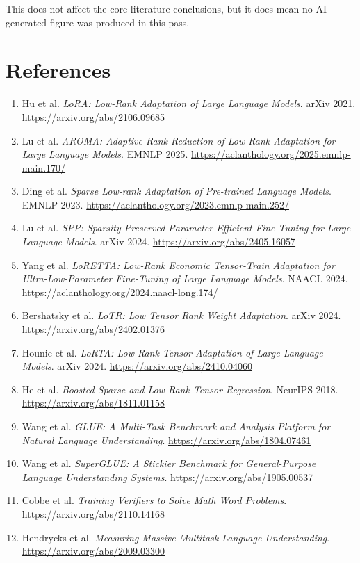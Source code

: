 \documentclass[11pt]{article}
\begin{document}
This does not affect the core literature conclusions, but it does mean no AI-generated figure was produced in this pass.

\section{References}

\begin{enumerate}
\item Hu et al. \textit{LoRA: Low-Rank Adaptation of Large Language Models}. arXiv 2021. \url{https://arxiv.org/abs/2106.09685}
\item Lu et al. \textit{AROMA: Adaptive Rank Reduction of Low-Rank Adaptation for Large Language Models}. EMNLP 2025. \url{https://aclanthology.org/2025.emnlp-main.170/}
\item Ding et al. \textit{Sparse Low-rank Adaptation of Pre-trained Language Models}. EMNLP 2023. \url{https://aclanthology.org/2023.emnlp-main.252/}
\item Lu et al. \textit{SPP: Sparsity-Preserved Parameter-Efficient Fine-Tuning for Large Language Models}. arXiv 2024. \url{https://arxiv.org/abs/2405.16057}
\item Yang et al. \textit{LoRETTA: Low-Rank Economic Tensor-Train Adaptation for Ultra-Low-Parameter Fine-Tuning of Large Language Models}. NAACL 2024. \url{https://aclanthology.org/2024.naacl-long.174/}
\item Bershatsky et al. \textit{LoTR: Low Tensor Rank Weight Adaptation}. arXiv 2024. \url{https://arxiv.org/abs/2402.01376}
\item Hounie et al. \textit{LoRTA: Low Rank Tensor Adaptation of Large Language Models}. arXiv 2024. \url{https://arxiv.org/abs/2410.04060}
\item He et al. \textit{Boosted Sparse and Low-Rank Tensor Regression}. NeurIPS 2018. \url{https://arxiv.org/abs/1811.01158}
\item Wang et al. \textit{GLUE: A Multi-Task Benchmark and Analysis Platform for Natural Language Understanding}. \url{https://arxiv.org/abs/1804.07461}
\item Wang et al. \textit{SuperGLUE: A Stickier Benchmark for General-Purpose Language Understanding Systems}. \url{https://arxiv.org/abs/1905.00537}
\item Cobbe et al. \textit{Training Verifiers to Solve Math Word Problems}. \url{https://arxiv.org/abs/2110.14168}
\item Hendrycks et al. \textit{Measuring Massive Multitask Language Understanding}. \url{https://arxiv.org/abs/2009.03300}
\end{enumerate}
\end{document}

